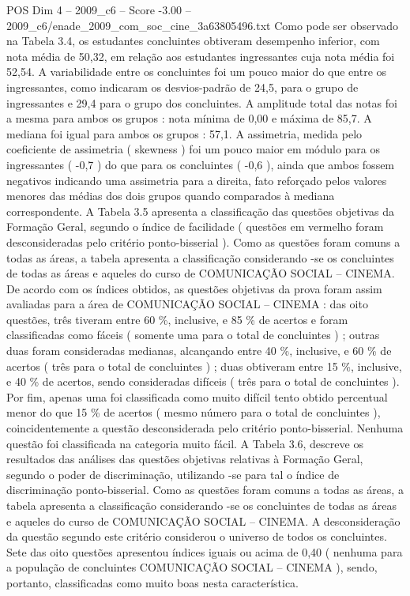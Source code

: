 \begin{textsample}{POS Dim 4 – 2009\_c6 – Score -3.00 – 2009\_c6/enade\_2009\_com\_soc\_cine\_3a63805496.txt}
Como pode ser observado na Tabela 3.4, os estudantes concluintes obtiveram desempenho inferior, com nota média de 50,32, em relação aos estudantes ingressantes cuja nota média foi 52,54.
A variabilidade entre os concluintes foi um pouco maior do que entre os ingressantes, como indicaram os desvios-padrão de 24,5, para o grupo de ingressantes e 29,4 para o grupo dos concluintes.
A amplitude total das notas foi a mesma para ambos os grupos : nota mínima de 0,00 e máxima de 85,7.
A mediana foi igual para ambos os grupos : 57,1.
A assimetria, medida pelo coeficiente de assimetria ( skewness ) foi um pouco maior em módulo para os ingressantes ( -0,7 ) do que para os concluintes ( -0,6 ), ainda que ambos fossem negativos indicando uma assimetria para a direita, fato reforçado pelos valores menores das médias dos dois grupos quando comparados à mediana correspondente.
A Tabela 3.5 apresenta a classificação das questões objetivas da Formação Geral, segundo o índice de facilidade ( questões em vermelho foram desconsideradas pelo critério ponto-bisserial ).
Como as questões foram comuns a todas as áreas, a tabela apresenta a classificação considerando -se os concluintes de todas as áreas e aqueles do curso de COMUNICAÇÃO SOCIAL – CINEMA.
De acordo com os índices obtidos, as questões objetivas da prova foram assim avaliadas para a área de COMUNICAÇÃO SOCIAL – CINEMA : das oito questões, três tiveram entre 60 \%, inclusive, e 85 \% de acertos e foram classificadas como fáceis ( somente uma para o total de concluintes ) ; outras duas foram consideradas medianas, alcançando entre 40 \%, inclusive, e 60 \% de acertos ( três para o total de concluintes ) ; duas obtiveram entre 15 \%, inclusive, e 40 \% de acertos, sendo consideradas difíceis ( três para o total de concluintes ).
Por fim, apenas uma foi classificada como muito difícil tento obtido percentual menor do que 15 \% de acertos ( mesmo número para o total de concluintes ), coincidentemente a questão desconsiderada pelo critério ponto-bisserial.
Nenhuma questão foi classificada na categoria muito fácil.
A Tabela 3.6, descreve os resultados das análises das questões objetivas relativas à Formação Geral, segundo o poder de discriminação, utilizando -se para tal o índice de discriminação ponto-bisserial.
Como as questões foram comuns a todas as áreas, a tabela apresenta a classificação considerando -se os concluintes de todas as áreas e aqueles do curso de COMUNICAÇÃO SOCIAL – CINEMA.
A desconsideração da questão segundo este critério considerou o universo de todos os concluintes.
Sete das oito questões apresentou índices iguais ou acima de 0,40 ( nenhuma para a população de concluintes COMUNICAÇÃO SOCIAL – CINEMA ), sendo, portanto, classificadas como muito boas nesta característica.

\end{textsample}
